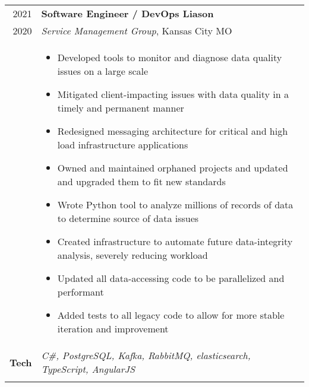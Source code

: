 \documentclass[a4paper,10pt]{article}
\newcommand{\br}{\\\multicolumn{2}{c}{}}
\begin{document}
\begin{tabular}{r|p{15cm}}
  \textsc{2021}  & \textbf{Software Engineer / DevOps Liason} \\
  \textsc{2020}  & \textit{Service Management Group}, Kansas City MO
  \\ &
       \begin{itemize}
       \item Developed tools to monitor and diagnose data quality issues on a large scale
       \item Mitigated client-impacting issues with data quality in a timely and permanent manner
       \item Redesigned messaging architecture for critical and high load infrastructure applications
       \item Owned and maintained orphaned projects and updated and upgraded them to fit new standards
       \item Wrote Python tool to analyze millions of records of data to determine source of data issues
       \item Created infrastructure to automate future data-integrity analysis, severely reducing workload
       \item Updated all data-accessing code to be parallelized and performant
       \item Added tests to all legacy code to allow for more stable iteration and improvement
       \end{itemize} \\
  \textbf{Tech} & \textit{C\#, PostgreSQL, Kafka, RabbitMQ, elasticsearch, TypeScript, AngularJS} \br \\
\end{tabular}
\end{document}
